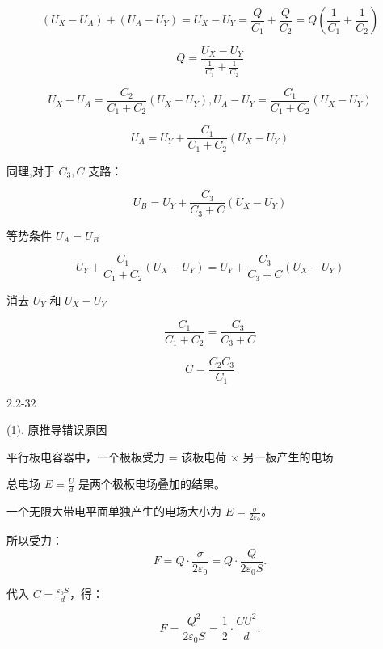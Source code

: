 \documentclass{article}
\begin{document}
$$ (U_X - U_A) + (U_A - U_Y) = U_X - U_Y = \frac{Q}{C_1} + \frac{Q}{C_2} = Q \left( \frac{1}{C_1} + \frac{1}{C_2} \right) $$  

 $$ Q = \frac{U_X - U_Y}{\frac{1}{C_1} + \frac{1}{C_2}} $$


 
$$ U_X - U_A = \frac{C_2}{C_1 + C_2} (U_X - U_Y) , U_A - U_Y = \frac{C_1}{C_1 + C_2} (U_X - U_Y) $$


$$U_A = U_Y + \frac{C_1}{C_1 + C_2} (U_X - U_Y)$$


同理,对于 $ C_3, C $ 支路：

$$U_B = U_Y + \frac{C_3}{C_3 + C} (U_X - U_Y)$$



等势条件 $ U_A = U_B $

$$U_Y + \frac{C_1}{C_1 + C_2} (U_X - U_Y) = U_Y + \frac{C_3}{C_3 + C} (U_X - U_Y)$$

消去 $ U_Y $ 和 $ U_X - U_Y $

$$\frac{C_1}{C_1 + C_2} = \frac{C_3}{C_3 + C}$$

$$
\boxed{C = \frac{C_2 C_3}{C_1}}
$$








\newpage

2.2-32 %





(1). 原推导错误原因

平行板电容器中，一个极板受力 = 该板电荷 × 另一板产生的电场

总电场 $ E = \frac{U}{d} $ 是两个极板电场叠加的结果。  

一个无限大带电平面单独产生的电场大小为 $ E = \frac{\sigma}{2\varepsilon_0} $。

所以受力：
$$F = Q \cdot \frac{\sigma}{2\varepsilon_0} = Q \cdot \frac{Q}{2\varepsilon_0 S}.$$

代入 $ C = \frac{\varepsilon_0 S}{d} $，得：

$$F = \frac{Q^2}{2\varepsilon_0 S} = \frac12 \cdot \frac{C U^2}{d}.$$
\end{document}
